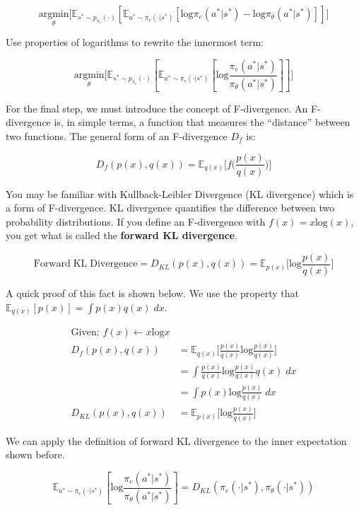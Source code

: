 \begin{flushleft}
    $$\underset{\theta}{\textrm{argmin}}\biggl[\mathbb{E}_{s^\ast \sim p_{\pi_e}(\cdot)}[\mathbb{E}_{a^\ast \sim \pi_e(\cdot|s^\ast)}[\mathrm{log}\pi_e(a^\ast|s^\ast) - \mathrm{log}\pi_\theta(a^\ast|s^\ast)]]\biggr]$$

    Use properties of logarithms to rewrite the innermost term:

    $$\underset{\theta}{\textrm{argmin}}\biggl[\mathbb{E}_{s^\ast \sim p_{\pi_e}(\cdot)}[\mathbb{E}_{a^\ast \sim \pi_e(\cdot|s^\ast)}[\mathrm{log}\frac{\pi_e(a^\ast|s^\ast)}{\pi_\theta(a^\ast|s^\ast)}]]\biggr]$$

    For the final step, we must introduce the concept of F-divergence. An F-divergence is, in simple terms, a function that measures the ``distance'' between two functions. The general form of an F-divergence $D_f$ is:

    $$D_f(p(x),q(x)) = \mathbb{E}_{q(x)} \biggl[ f\biggl( \frac{p(x)}{q(x)}\biggr)\biggr]$$
    
    You may be familiar with Kullback-Leibler Divergence (KL divergence) which is a form of F-divergence. KL divergence quantifies the difference between two probability distributions. If you define an F-divergence with $f(x) = x\mathrm{log}(x)$, you get what is called the \textbf{forward KL divergence}.
    
    $$\mathrm{Forward\;KL\;Divergence} = D_{KL}(p(x),q(x)) = \mathbb{E}_{p(x)} \biggl[\mathrm{log}\frac{p(x)}{q(x)}\biggr]$$
    
    A quick proof of this fact is shown below. We use the property that $\mathbb{E}_{q(x)}[p(x)] = \int p(x)q(x)\;dx$.

    \begin{align*}
        \textrm{Given: }f(x) \leftarrow x\mathrm{log}x \\
        D_f(p(x),q(x))\ &= \mathbb{E}_{q(x)} \biggl[ \frac{p(x)}{q(x)}\mathrm{log}\frac{p(x)}{q(x)}\biggr]\\
        &= \int \frac{p(x)}{q(x)}\mathrm{log}\frac{p(x)}{q(x)}q(x)\;dx\\
        &= \int p(x)\mathrm{log}\frac{p(x)}{q(x)}\;dx\\
        D_{KL}(p(x),q(x)) &= \mathbb{E}_{p(x)} \biggl[\mathrm{log}\frac{p(x)}{q(x)}\biggr]
    \end{align*}

    We can apply the definition of forward KL divergence to the inner expectation shown before.

    $$\mathbb{E}_{a^\ast \sim \pi_e(\cdot|s^\ast)}[\mathrm{log}\frac{\pi_e(a^\ast|s^\ast)}{\pi_\theta(a^\ast|s^\ast)}] = D_{KL}(\pi_e(\cdot|s^\ast),\pi_\theta(\cdot|s^\ast))$$


\end{flushleft}
